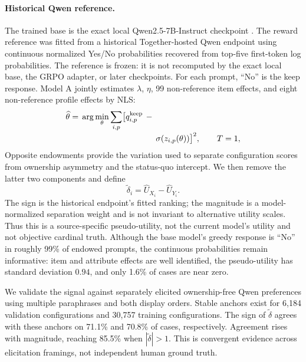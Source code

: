 \documentclass[letterpaper]{article} %
\begin{document}
\paragraph{Historical Qwen reference.}
The trained base is the exact local Qwen2.5-7B-Instruct checkpoint
\citep{qwen2024qwen25}. The reward reference was fitted from a historical
Together-hosted Qwen endpoint using continuous normalized Yes/No probabilities
recovered from top-five first-token log probabilities. The reference is frozen:
it is not recomputed by the exact local base, the GRPO adapter, or later
checkpoints. For each prompt,
``No'' is the keep response. Model A jointly estimates $\lambda$, $\eta$, 99
non-reference item effects, and eight non-reference profile effects by NLS:
\begin{equation}
\begin{split}
\widehat\theta={}&\arg\min_\theta\sum_{i,p}
\bigl[q^{\mathrm{keep}}_{i,p}\,{}-{}\\[-2pt]
&\hspace{32mm}\sigma(z_{i,p}(\theta))\bigr]^2,
\qquad T=1,
\end{split}
\end{equation}
Opposite endowments provide the variation used to separate configuration
scores from ownership asymmetry and the status-quo intercept. We then remove
the latter two components and define
\begin{equation}
\widetilde{\delta}_i=\widehat U_{X_i}-\widehat U_{Y_i}.
\end{equation}
The sign is the historical endpoint's fitted ranking; the magnitude is a
model-normalized separation weight and is not invariant to alternative utility
scales. Thus this is a source-specific pseudo-utility, not the current model's
utility and not objective cardinal
truth. Although
the base model's greedy response is ``No'' in roughly 99\% of endowed prompts,
the continuous probabilities remain informative: item and attribute effects
are well identified, the pseudo-utility has standard deviation $0.94$, and
only 1.6\% of cases are near zero.

We validate the signal against separately elicited ownership-free Qwen
preferences using multiple paraphrases and both display orders. Stable anchors
exist for 6,184 validation configurations and 30,757 training configurations.
The sign of $\widetilde{\delta}$ agrees with these anchors on 71.1\% and 70.8\%
of cases, respectively. Agreement rises with magnitude, reaching 85.5\% when
$|\widetilde{\delta}|>1$. This is convergent evidence across elicitation
framings, not independent human ground truth.
\end{document}
